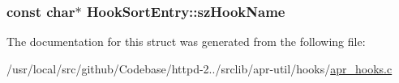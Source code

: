 \subsubsection[{\texorpdfstring{sz\+Hook\+Name}{szHookName}}]{\setlength{\rightskip}{0pt plus 5cm}const char$\ast$ Hook\+Sort\+Entry\+::sz\+Hook\+Name}\hypertarget{structHookSortEntry_a4b11a479edbe6477f3edad848807f5f6}{}\label{structHookSortEntry_a4b11a479edbe6477f3edad848807f5f6}


The documentation for this struct was generated from the following file\+:\begin{DoxyCompactItemize}
\item 
/usr/local/src/github/\+Codebase/httpd-\/2../srclib/apr-\/util/hooks/\hyperlink{apr__hooks_8c}{apr\+\_\+hooks.\+c}\end{DoxyCompactItemize}
